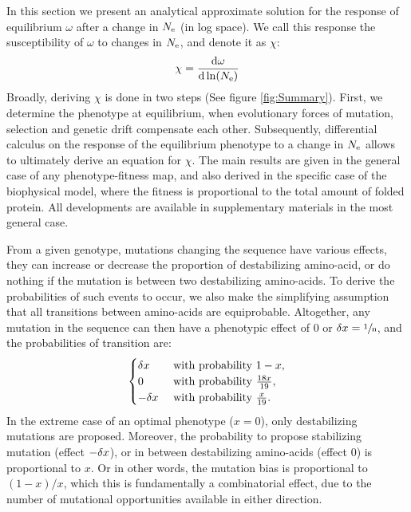 \documentclass{MBE}%
\begin{document}
In this section we present an analytical approximate solution for the response of equilibrium $\omega$ after a change in $N_{\mathrm{e}}$ (in log space). We call this response the susceptibility of $\omega$ to changes in $N_{\mathrm{e}}$, and denote it as $\chi$:
\begin{align}
 \chi = \frac{ \der \omega}{\der \ln (\Ne)} \label{eq:chi}
\end{align}
Broadly, deriving $\chi$ is done in two steps (See figure \ref{fig:Summary}).
First, we determine the phenotype at equilibrium, when evolutionary forces of mutation, selection and genetic drift compensate each other.
Subsequently, differential calculus on the response of the equilibrium phenotype to a change in $N_{\mathrm{e}}$ allows to ultimately derive an equation for $\chi$.
The main results are given in the general case of any phenotype-fitness map, and also derived in the specific case of the biophysical model, where the fitness is proportional to the total amount of folded protein.
All developments are available in supplementary materials in the most general case.

From a given genotype, mutations changing the sequence have various effects, they can increase or decrease the proportion of destabilizing amino-acid, or do nothing if the mutation is between two destabilizing amino-acids.
To derive the probabilities of such events to occur, we also make the simplifying assumption that all transitions between amino-acids are equiprobable.
Altogether, any mutation in the sequence can then have a phenotypic effect of $0$ or $\delta x=\sfrac{1}{\text{n}}$, and the probabilities of transition are:
\begin{gather}
 \begin{cases}
 \dx &\text{ with probability } 1-x, \\
 0 &\text{ with probability } \frac{18 x }{19}, \\
 -\dx &\text{ with probability } \frac{x}{19}.\\
 \end{cases} \label{eq:proba}
\end{gather}
In the extreme case of an optimal phenotype ($x = 0$), only destabilizing mutations are proposed.
Moreover, the probability to propose stabilizing mutation (effect $-\delta x$), or in between destabilizing amino-acids (effect $0$) is proportional to $x$. 
Or in other words, the mutation bias is proportional to $(1-x)/x$, which this is fundamentally a combinatorial effect, due to the number of mutational opportunities available in either direction.
\end{document}
